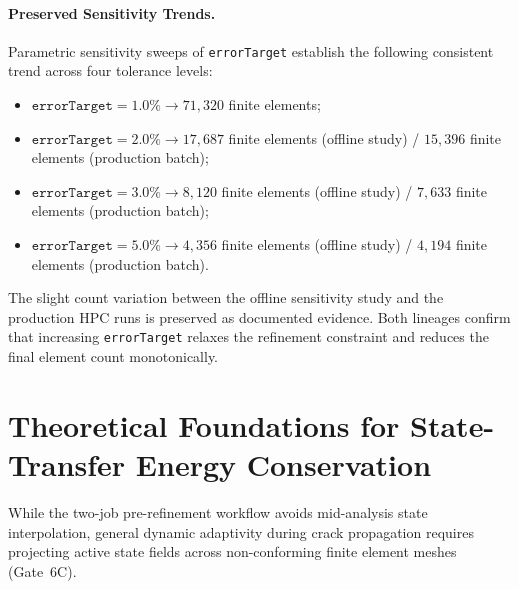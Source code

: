 \paragraph{Preserved Sensitivity Trends.}
Parametric sensitivity sweeps of \texttt{errorTarget} establish the following consistent trend across four tolerance levels:
\begin{itemize}
  \item $\mathtt{errorTarget} = 1.0\% \longrightarrow 71{,}320$ finite elements;
  \item $\mathtt{errorTarget} = 2.0\% \longrightarrow 17{,}687$ finite elements (offline study) / $15{,}396$ finite elements (production batch);
  \item $\mathtt{errorTarget} = 3.0\% \longrightarrow 8{,}120$ finite elements (offline study) / $7{,}633$ finite elements (production batch);
  \item $\mathtt{errorTarget} = 5.0\% \longrightarrow 4{,}356$ finite elements (offline study) / $4{,}194$ finite elements (production batch).
\end{itemize}
The slight count variation between the offline sensitivity study and the production HPC runs is preserved as documented evidence. Both lineages confirm that increasing \texttt{errorTarget} relaxes the refinement constraint and reduces the final element count monotonically.

\section{Theoretical Foundations for State-Transfer Energy Conservation}
\label{sec:state_transfer_foundations}

While the two-job pre-refinement workflow avoids mid-analysis state interpolation, general dynamic adaptivity during crack propagation requires projecting active state fields across non-conforming finite element meshes (Gate~6C).

